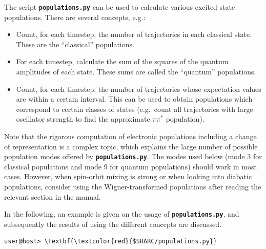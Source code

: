 \documentclass[a4paper,11pt,DIV=15,openany]{scrbook}
\newcommand{\ttt}[1]{\textbf{\texttt{#1}}}
\begin{document}
The script \ttt{populations.py} can be used to calculate various excited-state populations. There are several concepts, e.g.:
\begin{itemize}
  \item Count, for each timestep, the number of trajectories in each classical state. These are the ``classical'' populations. 
  \item For each timestep, calculate the sum of the squares of the quantum amplitudes of each state. These sums are called the ``quantum'' populations.
  \item Count, for each timestep, the number of trajectories whose expectation values are within a certain interval. This can be used to obtain populations which correspond to certain classes of states (e.g.\ count all trajectories with large oscillator strength to find the approximate $\pi\pi^*$ population).
\end{itemize}

Note that the rigorous computation of electronic populations including a change of representation is a complex topic, which explains the large number of possible population modes offered by \ttt{populations.py}.
The modes used below (mode 3 for classical populations and mode 9 for quantum populations) should work in most cases.
However, when spin-orbit mixing is strong or when looking into diabatic populations, consider using the Wigner-transformed populations after reading the relevant section in the manual.

In the following, an example is given on the usage of \ttt{populations.py}, and subsequently the results of using the different concepts are discussed.
\begin{Verbatim}[commandchars=\\\{\}]
user@host> \textbf{\textcolor{red}{$SHARC/populations.py}}
\end{Verbatim}
\end{document}
